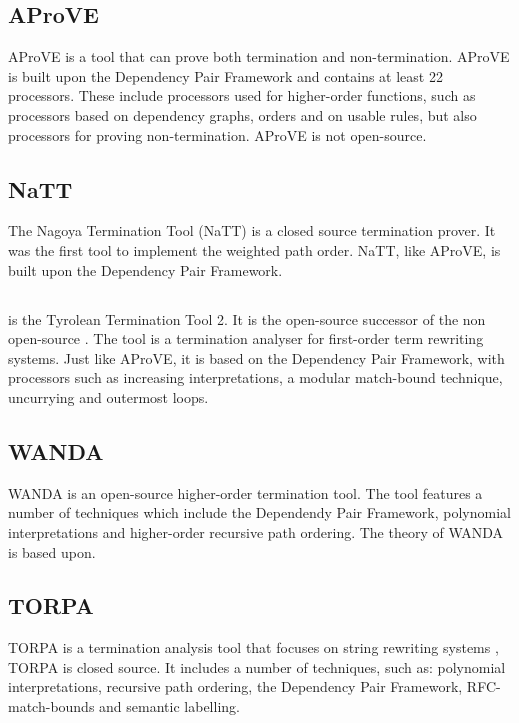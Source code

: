 \subsection*{AProVE}
AProVE\cite{10.1007/11814771_24} is a tool that can prove both termination and non-termination. AProVE is built upon the Dependency Pair Framework and contains at least 22 processors. These include processors used for higher-order functions, such as processors based on dependency graphs, orders and on usable rules, but also processors for proving non-termination\cite{GIESL:APROVE}. AProVE is not open-source. 

\subsection*{NaTT}
The Nagoya Termination Tool (NaTT) is a closed source termination prover\cite{Yamada2014NagoyaTT}. It was the first tool to implement the weighted path order. NaTT, like AProVE, is built upon the Dependency Pair Framework. 

\subsection*{\TTTT}
\TTTT is the Tyrolean Termination Tool 2\cite{TTTT}. It is the open-source successor of the non open-source \TTT \cite{HIROKAWA2007474}. The tool is a termination analyser for first-order term rewriting systems. Just like AProVE, it is based on the Dependency Pair Framework, with processors such as increasing interpretations, a modular match-bound technique, uncurrying and outermost loops\cite{TTTT}.

\subsection*{WANDA}
WANDA is an open-source higher-order termination tool\cite{KOP:WANDASITE}. The tool features a number of techniques which include the Dependendy Pair Framework, polynomial interpretations and higher-order recursive path ordering. The theory of WANDA is based upon\cite{KOP:WANDA}. 

\subsection*{TORPA}
TORPA is a termination analysis tool that focuses on string rewriting systems \cite{ZANTEMA:TORPA}, TORPA is closed source. It includes a number of techniques, such as: polynomial interpretations, recursive path ordering, the Dependency Pair Framework, RFC-match-bounds and semantic labelling. 